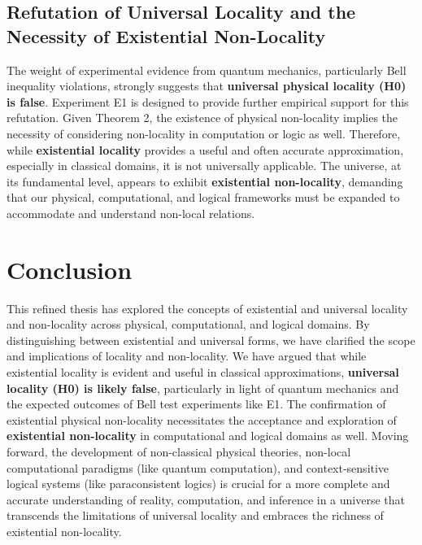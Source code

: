 \documentclass{article}
\begin{document}
	\subsection{Refutation of Universal Locality and the Necessity of Existential Non-Locality}
	
	The weight of experimental evidence from quantum mechanics, particularly Bell inequality violations, strongly suggests that \textbf{universal physical locality (H0) is false}. Experiment E1 is designed to provide further empirical support for this refutation.  Given Theorem 2, the existence of physical non-locality implies the necessity of considering non-locality in computation or logic as well.  Therefore, while \textbf{existential locality} provides a useful and often accurate approximation, especially in classical domains, it is not universally applicable.  The universe, at its fundamental level, appears to exhibit \textbf{existential non-locality}, demanding that our physical, computational, and logical frameworks must be expanded to accommodate and understand non-local relations.
	
	\section{Conclusion}
	
	This refined thesis has explored the concepts of existential and universal locality and non-locality across physical, computational, and logical domains. By distinguishing between existential and universal forms, we have clarified the scope and implications of locality and non-locality. We have argued that while existential locality is evident and useful in classical approximations, \textbf{universal locality (H0) is likely false}, particularly in light of quantum mechanics and the expected outcomes of Bell test experiments like E1.  The confirmation of existential physical non-locality necessitates the acceptance and exploration of \textbf{existential non-locality} in computational and logical domains as well.  Moving forward, the development of non-classical physical theories, non-local computational paradigms (like quantum computation), and context-sensitive logical systems (like paraconsistent logics) is crucial for a more complete and accurate understanding of reality, computation, and inference in a universe that transcends the limitations of universal locality and embraces the richness of existential non-locality.
	
\end{document}
